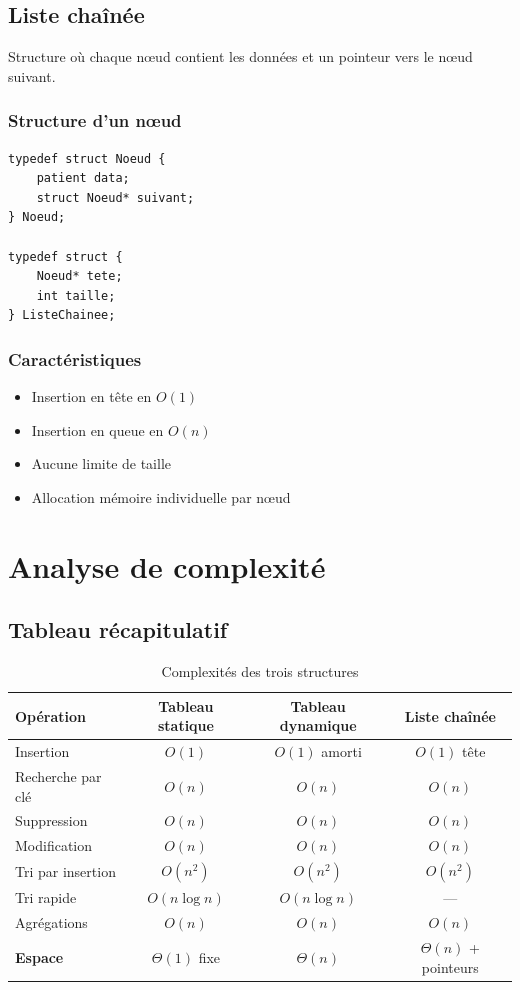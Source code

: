 \documentclass[12pt, a4paper]{article}
\begin{document}
\subsection{Liste chaînée}
Structure où chaque nœud contient les données et un pointeur 
vers le nœud suivant.

\subsubsection{Structure d'un nœud}
\begin{verbatim}
typedef struct Noeud {
    patient data;
    struct Noeud* suivant;
} Noeud;

typedef struct {
    Noeud* tete;
    int taille;
} ListeChainee;
\end{verbatim}

\subsubsection{Caractéristiques}
\begin{itemize}[leftmargin=2em, itemsep=3pt]
    \item Insertion en tête en $O(1)$
    \item Insertion en queue en $O(n)$
    \item Aucune limite de taille
    \item Allocation mémoire individuelle par nœud
\end{itemize}

\section{Analyse de complexité}

\subsection{Tableau récapitulatif}

\begin{table}[h]
\centering
{}
\begin{tabular}{l c c c}
\toprule
\textbf{Opération} & \textbf{Tableau statique} & \textbf{Tableau dynamique} & \textbf{Liste chaînée} \\
\midrule
Insertion & $O(1)$ & $O(1)$ amorti & $O(1)$ tête \\
Recherche par clé & $O(n)$ & $O(n)$ & $O(n)$ \\
Suppression & $O(n)$ & $O(n)$ & $O(n)$ \\
Modification & $O(n)$ & $O(n)$ & $O(n)$ \\
Tri par insertion & $O(n^2)$ & $O(n^2)$ & $O(n^2)$ \\
Tri rapide & $O(n\log n)$ & $O(n\log n)$ & --- \\
Agrégations & $O(n)$ & $O(n)$ & $O(n)$ \\
\midrule
\textbf{Espace} & $\Theta(1)$ fixe & $\Theta(n)$ & $\Theta(n)$ + pointeurs \\
\bottomrule
\end{tabular}
\caption{Complexités des trois structures}
\end{table}
\end{document}
